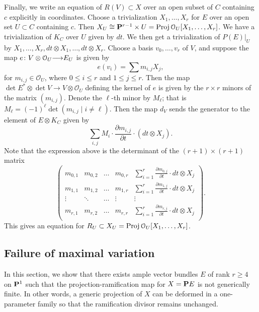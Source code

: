 \documentclass[11pt,reqno]{amsart}
\theoremstyle{plain}
\theoremstyle{definition}
\theoremstyle{remark}
\numberwithin{equation}{section}
\renewcommand{\to}{{\longrightarrow}}
\numberwithin{equation}{section}
\renewcommand{\O}{\mathcal O}
\newcommand{\Proj}{{\text{\rm Proj}\,}}
\begin{document}
Finally, we write an equation of $R(V) \subset X$ over an open subset of $C$ containing $c$ explicitly in coordinates.
Choose a trivialization $X_1, \dots, X_r$ for $E$ over an open set $U \subset C$ containing $c$.
Then $X_U \cong \P^{r-1} \times U = \Proj \O_U[X_1, \dots, X_r]$.
We have a trivialization of $K_C$ over $U$ given by $dt$.
We then get a trivialization of $P(E)|_U$ by $X_1, \dots, X_r, dt \otimes X_1, \dots, dt \otimes X_r$.
Choose a basis $v_0, \dots, v_r$ of $V$, and suppose the map $e \from V \otimes \O_U \to E_U$ is given by
\[ e(v_i) = \sum m_{i,j} X_j,\]
for $m_{i,j} \in \O_U$, where $0 \leq i \leq r$ and $1 \leq j \leq r$.
Then the map $\det E^* \otimes \det V \to V \otimes \O_U$ defining the kernel of $e$ is given by the $r \times r$ minors of the matrix $(m_{i,j})$.
Denote the $\ell$-th minor by $M_\ell$; that is $M_\ell = (-1)^{\ell}\det (m_{i,j} \mid i \neq \ell)$.
Then the map $d_V$ sends the generator to the element of $E \otimes K_C$ given by
\[ \sum_{i,j} M_i \cdot \frac{\partial m_{i,j}}{\partial t} \cdot (dt \otimes X_j).\]
Note that the expression above is the determinant of the $(r+1) \times (r+1)$ matrix
\begin{equation}\label{eqn:Rmatrix}
  \begin{pmatrix}
  m_{0,1} & m_{0,2} & \dots & m_{0,r} & \sum_{i = 1}^r \frac {\partial m_{0,j}}{\partial t} \cdot dt \otimes X_j \\
  m_{1,1} & m_{1,2} & \dots & m_{1,r} & \sum_{i = 1}^r \frac {\partial m_{1,j}}{\partial t} \cdot dt \otimes X_j \\
  \vdots & \ddots & \dots & \vdots & \vdots \\
  m_{r,1} & m_{r,2} & \dots & m_{r,r} & \sum_{i = 1}^r \frac {\partial m_{r,j}}{\partial t} \cdot dt \otimes X_j \\
\end{pmatrix}.
\end{equation}
This gives an equation for $R_U \subset X_U = \Proj \O_U[X_1, \dots, X_r]$.

\subsection{Failure of maximal variation}\label{sec:failure}
In this section, we show that there exists ample vector bundles $E$ of rank $r \geq 4$ on $\P^1$ such that the projection-ramification map for $X = \P E$ is not generically finite.
In other words, a generic projection of $X$ can be deformed in a one-parameter family so that the ramification divisor remains unchanged.
\end{document}
